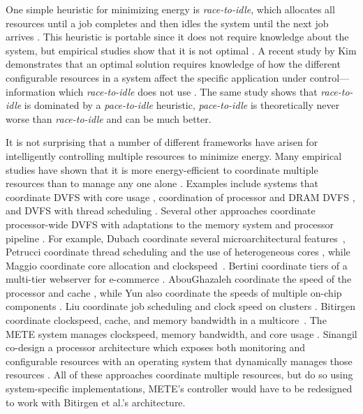 One simple heuristic for minimizing energy is \emph{race-to-idle}, which allocates all resources until a job completes and then idles the system until the next job arrives \cite{google}.
This heuristic is portable since it does not require knowledge about the system, but empirical studies show that it is not optimal \cite{google,Cheng2009,Yang2007,Yun2010}.
A recent study by Kim \etal demonstrates that an optimal solution requires knowledge of how the different configurable resources in a system affect the specific application under control---information which \emph{race-to-idle} does not use \cite{kim-cpsna2015}.
The same study shows that \emph{race-to-idle} is dominated by a \emph{pace-to-idle} heuristic, \ie \emph{pace-to-idle} is theoretically never worse than \emph{race-to-idle} and can be much better.

It is not surprising that a number of different frameworks have arisen for intelligently controlling multiple resources to minimize energy.
Many empirical studies have shown that it is more energy-efficient to coordinate multiple resources than to manage any one alone \cite{google,Cheng2009,Yang2007,Yun2010}.
Examples include systems that coordinate DVFS with core usage \cite{packandcap-old,TCST,packandcap-new}, coordination of processor and DRAM DVFS \cite{Chen2011,CoScale,Felter2005,Li2007}, and DVFS with thread scheduling \cite{Rangan2009,Winter2010}.
Several other approaches coordinate processor-wide DVFS with adaptations to the memory system and processor pipeline \cite{Bitirgen2008,dubach2010,METE}.
For example, Dubach \etal coordinate several microarchitectural features~\cite{dubach2010},
Petrucci \etal coordinate thread scheduling and the use of heterogeneous cores \cite{Petrucci2012}, while Maggio \etal coordinate core allocation and clockspeed~\cite{TCST}.
Bertini \etal coordinate tiers of a multi-tier webserver for e-commerce \cite{Bertini2007}.
AbouGhazaleh \etal coordinate the speed of the processor and cache \cite{AbouGhazaleh2007}, while Yun \etal also coordinate the speeds of multiple on-chip components \cite{Yun2010}.
Liu \etal coordinate job scheduling and clock speed on clusters \cite{Liu2008}.
Bitirgen \etal coordinate clockspeed, cache, and memory bandwidth in a multicore~\cite{Bitirgen2008}.
The METE system manages clockspeed, memory bandwidth, and core usage \cite{METE}.
Sinangil \etal co-design a processor architecture which exposes both monitoring and configurable resources with an operating system that dynamically manages those resources \cite{sinangil2014self}.
All of these approaches coordinate multiple resources, but do so using system-specific implementations, \eg METE's controller would have to be redesigned to work with Bitirgen et al.'s architecture.

